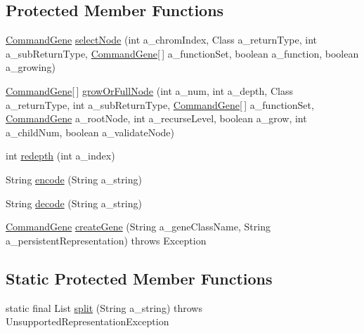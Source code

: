 \subsection*{Protected Member Functions}
\begin{DoxyCompactItemize}
\item 
\hyperlink{classorg_1_1jgap_1_1gp_1_1_command_gene}{Command\-Gene} \hyperlink{classorg_1_1jgap_1_1gp_1_1impl_1_1_program_chromosome_a1e11a46dcd815ed2778c03800abd8e56}{select\-Node} (int a\-\_\-chrom\-Index, Class a\-\_\-return\-Type, int a\-\_\-sub\-Return\-Type, \hyperlink{classorg_1_1jgap_1_1gp_1_1_command_gene}{Command\-Gene}\mbox{[}$\,$\mbox{]} a\-\_\-function\-Set, boolean a\-\_\-function, boolean a\-\_\-growing)
\item 
\hyperlink{classorg_1_1jgap_1_1gp_1_1_command_gene}{Command\-Gene}\mbox{[}$\,$\mbox{]} \hyperlink{classorg_1_1jgap_1_1gp_1_1impl_1_1_program_chromosome_a1ca14815335297629dc3bd4812445405}{grow\-Or\-Full\-Node} (int a\-\_\-num, int a\-\_\-depth, Class a\-\_\-return\-Type, int a\-\_\-sub\-Return\-Type, \hyperlink{classorg_1_1jgap_1_1gp_1_1_command_gene}{Command\-Gene}\mbox{[}$\,$\mbox{]} a\-\_\-function\-Set, \hyperlink{classorg_1_1jgap_1_1gp_1_1_command_gene}{Command\-Gene} a\-\_\-root\-Node, int a\-\_\-recurse\-Level, boolean a\-\_\-grow, int a\-\_\-child\-Num, boolean a\-\_\-validate\-Node)
\item 
int \hyperlink{classorg_1_1jgap_1_1gp_1_1impl_1_1_program_chromosome_af63010758c5c507c9e58889cc37e985e}{redepth} (int a\-\_\-index)
\item 
String \hyperlink{classorg_1_1jgap_1_1gp_1_1impl_1_1_program_chromosome_a1ceca8b2f7a033bf9ab63f70b438c211}{encode} (String a\-\_\-string)
\item 
String \hyperlink{classorg_1_1jgap_1_1gp_1_1impl_1_1_program_chromosome_a7a41513bb42bc79e7708c46afd61b4a4}{decode} (String a\-\_\-string)
\item 
\hyperlink{classorg_1_1jgap_1_1gp_1_1_command_gene}{Command\-Gene} \hyperlink{classorg_1_1jgap_1_1gp_1_1impl_1_1_program_chromosome_a5a09ecbda2b198791e979d3dae3b0f01}{create\-Gene} (String a\-\_\-gene\-Class\-Name, String a\-\_\-persistent\-Representation)  throws Exception 
\end{DoxyCompactItemize}
\subsection*{Static Protected Member Functions}
\begin{DoxyCompactItemize}
\item 
static final List \hyperlink{classorg_1_1jgap_1_1gp_1_1impl_1_1_program_chromosome_a5db9d5ee745620591027ff0572e2cff3}{split} (String a\-\_\-string)  throws Unsupported\-Representation\-Exception 
\end{DoxyCompactItemize}
